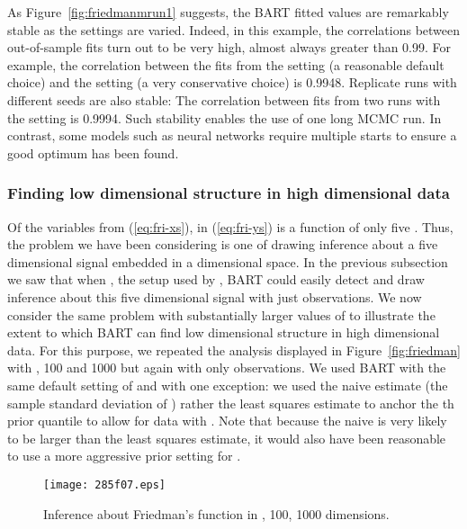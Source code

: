 \documentclass[aoas,nameyear,dvips]{arximspdf}
\newcommand{\citeasnoun}[1]{\citet{#1}}
\begin{document}
As Figure~\ref{fig:friedmanmrun1} suggests, the BART fitted values
are remarkably stable as the settings are varied. Indeed, in this
example, the correlations between out-of-sample fits turn out to
be very high, almost always greater than 0.99. For example, the
correlation between the fits from the 
setting (a reasonable default choice) and the 
setting (a very conservative choice) is 0.9948. Replicate runs with
different seeds are also stable: The correlation between fits from
two runs with the  setting is 0.9994. Such stability
enables the use of one long MCMC run.  In contrast, some models
such as neural networks require multiple starts to ensure a good
optimum has been found.


\subsubsection{Finding low dimensional structure in high dimensional data}\label{sec:friedman-finding}

Of the  variables  from (\ref{eq:fri-xs}), 
in (\ref{eq:fri-ys}) is a function of only five .
Thus, the problem we have been considering is one of drawing
inference about a five dimensional signal embedded in a 
dimensional space. In the previous subsection we saw that when , the setup used by \citeasnoun{Frie1991}, BART could easily
detect and draw inference about this five dimensional signal with
just  observations. We now consider the same problem with
substantially larger values of  to illustrate the extent to
which BART can find low dimensional structure in high dimensional
data.   For this purpose, we repeated the analysis displayed in
Figure~\ref{fig:friedman} with , 100 and 1000 but again
with only  observations.  We used BART with the same
default setting of  and  with
one exception: we used the naive estimate  (the
sample standard deviation of ) rather the least squares
estimate to anchor the th prior quantile to allow for data with
. Note that because the naive  is very
likely to be larger than the least squares estimate, it would also
have been reasonable to use a more aggressive prior setting for
.


\begin{figure}

\texttt{[image: 285f07.eps]}

\caption{Inference about Friedman's function in , 100, 1000 dimensions.}\label{fig:friedmanbigp}
\end{figure}
\end{document}
